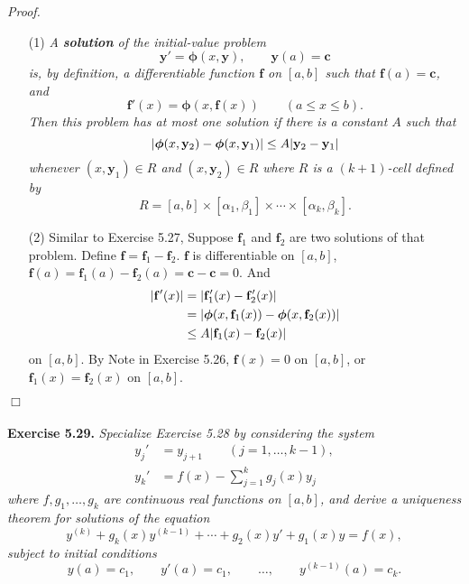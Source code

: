 \documentclass{article}
\begin{document}
\emph{Proof.}
\begin{enumerate}
\item[(1)]
\emph{A \textbf{solution} of the initial-value problem
\[
  \mathbf{y}' = \bm{\phi}(x,\mathbf{y}), \qquad
  \mathbf{y}(a) = \mathbf{c}
\]
is, by definition, a differentiable function $\mathbf{f}$ on $[a,b]$
such that $\mathbf{f}(a) = \mathbf{c}$, and
\[
  \mathbf{f}'(x) = \bm{\phi}(x,\mathbf{f}(x)) \qquad (a \leq x \leq b).
\]
Then this problem has at most one solution if there is a constant $A$ such that
\[
  \abs{ \bm{\phi}(x,\mathbf{y}_2) - \bm{\phi}(x,\mathbf{y}_1) }
  \leq A \abs{ \mathbf{y}_2 - \mathbf{y}_1 }
\]
whenever $(x,\mathbf{y}_1) \in R$ and $(x,\mathbf{y}_2) \in R$
where $R$ is a $(k+1)$-cell defined by
\[
  R = [a,b] \times [\alpha_1,\beta_1] \times \cdots \times [\alpha_k,\beta_k].
\]}
\item[(2)]
Similar to Exercise 5.27,
Suppose $\mathbf{f}_1$ and $\mathbf{f}_2$ are two solutions of that problem.
Define $\mathbf{f} = \mathbf{f}_1 - \mathbf{f}_2$.
$\mathbf{f}$ is differentiable on $[a,b]$,
$\mathbf{f}(a) = \mathbf{f}_1(a) - \mathbf{f}_2(a) = \mathbf{c} - \mathbf{c} = 0$.
And
\begin{align*}
  |\mathbf{f}'(x)|
  &= |\mathbf{f}_1'(x) - \mathbf{f}_2'(x)| \\
  &= \abs{ \bm{\phi}(x,\mathbf{f}_1(x)) - \bm{\phi}(x,\mathbf{f}_2(x)) } \\
  &\leq A | \mathbf{f}_1(x) - \mathbf{f}_2(x) |
\end{align*}
on $[a,b]$.
By Note in Exercise 5.26,
$\mathbf{f}(x) = 0$ on $[a,b]$, or $\mathbf{f}_1(x) = \mathbf{f}_2(x)$ on $[a,b]$.
\end{enumerate}
$\Box$ \\\\






\textbf{Exercise 5.29.}
\emph{Specialize Exercise 5.28 by considering the system
\begin{align*}
  y_j' &= y_{j+1} \qquad (j = 1, \ldots, k-1), \\
  y_k' &= f(x) - \sum_{j=1}^{k}{g_j(x)y_j}
\end{align*}
where $f, g_1, \ldots, g_k$ are continuous real functions on $[a,b]$,
and derive a uniqueness theorem for solutions of the equation
\[
  y^{(k)} + g_k(x)y^{(k-1)} + \cdots + g_2(x)y' + g_1(x)y = f(x),
\]
  subject to initial conditions
\[
  y(a) = c_1, \qquad
  y'(a) = c_1, \qquad
  \ldots, \qquad
  y^{(k-1)}(a) = c_k.
\]}
\end{document}
